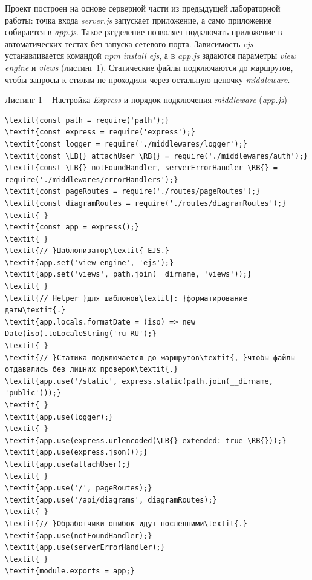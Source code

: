 \documentclass[14pt,a4paper]{extarticle}
\newcommand{\LB}{\char123}
\newcommand{\RB}{\char125}
\begin{document}
Проект построен на основе серверной части из предыдущей лабораторной работы: точка входа \textit{server.js} запускает приложение, а само приложение собирается в \textit{app.js}. Такое разделение позволяет подключать приложение в автоматических тестах без запуска сетевого порта. Зависимость \textit{ejs} устанавливается командой \textit{npm install ejs}, а в \textit{app.js} задаются параметры \textit{view engine} и \textit{views} (листинг 1). Статические файлы подключаются до маршрутов, чтобы запросы к стилям не проходили через остальную цепочку \textit{middleware}.

\noindent\vspace{18pt}\par\nopagebreak\noindent Листинг 1 – Настройка \textit{Express} и порядок подключения \textit{middleware} (\textit{app.js})\par\nopagebreak
\begin{Verbatim}[commandchars=\\\{\},fontsize=\small,baselinestretch=1]
\textit{const path = require('path');}
\textit{const express = require('express');}
\textit{const logger = require('./middlewares/logger');}
\textit{const \LB{} attachUser \RB{} = require('./middlewares/auth');}
\textit{const \LB{} notFoundHandler, serverErrorHandler \RB{} = require('./middlewares/errorHandlers');}
\textit{const pageRoutes = require('./routes/pageRoutes');}
\textit{const diagramRoutes = require('./routes/diagramRoutes');}
\textit{ }
\textit{const app = express();}
\textit{ }
\textit{// }Шаблонизатор\textit{ EJS.}
\textit{app.set('view engine', 'ejs');}
\textit{app.set('views', path.join(__dirname, 'views'));}
\textit{ }
\textit{// Helper }для шаблонов\textit{: }форматирование даты\textit{.}
\textit{app.locals.formatDate = (iso) => new Date(iso).toLocaleString('ru-RU');}
\textit{ }
\textit{// }Статика подключается до маршрутов\textit{, }чтобы файлы отдавались без лишних проверок\textit{.}
\textit{app.use('/static', express.static(path.join(__dirname, 'public')));}
\textit{ }
\textit{app.use(logger);}
\textit{ }
\textit{app.use(express.urlencoded(\LB{} extended: true \RB{}));}
\textit{app.use(express.json());}
\textit{app.use(attachUser);}
\textit{ }
\textit{app.use('/', pageRoutes);}
\textit{app.use('/api/diagrams', diagramRoutes);}
\textit{ }
\textit{// }Обработчики ошибок идут последними\textit{.}
\textit{app.use(notFoundHandler);}
\textit{app.use(serverErrorHandler);}
\textit{ }
\textit{module.exports = app;}
\end{Verbatim}
\vspace{18pt}
\end{document}
